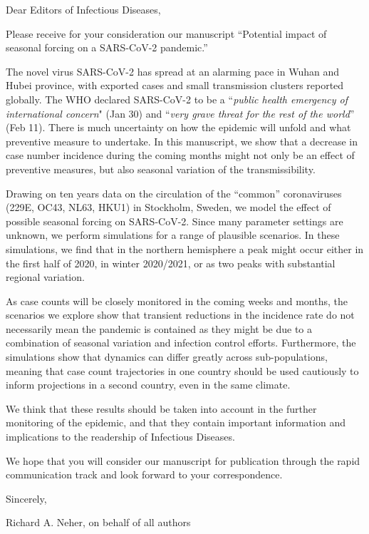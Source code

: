 \documentclass[rmp, eprint, superscriptaddress,floatfix]{revtex4-1}
\begin{document}
Dear Editors of Infectious Diseases,

Please receive for your consideration our manuscript “Potential impact of seasonal forcing on a SARS-CoV-2 pandemic.” 

The novel virus SARS-CoV-2 has spread at an alarming pace in Wuhan and Hubei province, with exported cases and small transmission clusters reported globally. The WHO declared SARS-CoV-2 to be a ``\textit{public health emergency of international concern}" (Jan 30) and ``\textit{very grave threat for the rest of the world}” (Feb 11). There is much uncertainty on how the epidemic will unfold and what preventive measure to undertake. In this manuscript, we show that a decrease in case number incidence during the coming months might not only be an effect of preventive measures, but also seasonal variation of the transmissibility.

Drawing on ten years data on the circulation of the “common” coronaviruses (229E, OC43, NL63, HKU1) in Stockholm, Sweden, we model the effect of possible seasonal forcing on SARS-CoV-2. Since many parameter settings are unknown, we perform simulations for a range of plausible scenarios. In these simulations, we find that in the northern hemisphere a peak might occur either in the first half of 2020, in winter 2020/2021, or as two peaks with substantial regional variation.

As case counts will be closely monitored in the coming weeks and months, the scenarios we explore show that transient reductions in the incidence rate do not necessarily mean the pandemic is contained as they might be due to a combination of seasonal variation and infection control efforts. Furthermore, the simulations show that dynamics can differ greatly across sub-populations, meaning that case count trajectories in one country should be used cautiously to inform projections in a second country, even in the same climate. 

We think that these results should be taken into account in the further monitoring of the epidemic, and that they contain important information and implications to the readership of Infectious Diseases. 

We hope that you will consider our manuscript for publication through the rapid communication track and look forward to
your correspondence. 

Sincerely,

Richard A. Neher, on behalf of all authors
\end{document}
